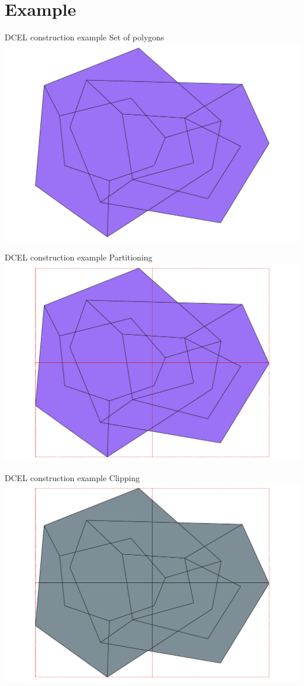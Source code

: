 \documentclass{beamer}
\begin{document}
\section{Example}
\begin{frame}{DCEL construction example}
    \centering 
    Set of polygons \\
    \includegraphics[width=0.8\linewidth]{figures/DCEL01_input} 
\end{frame}

\begin{frame}{DCEL construction example}
    \centering 
    Partitioning \\
    \includegraphics[width=0.8\linewidth]{figures/DCEL02_partitions} 
\end{frame}

\begin{frame}{DCEL construction example}
    \centering 
    Clipping \\
    \includegraphics[width=0.8\linewidth]{figures/DCEL03_clipByPartition} 
\end{frame}
\end{document}
